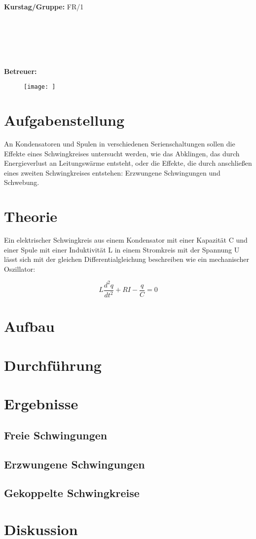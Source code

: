 \documentclass{article}
\begin{document}
\begin{verbatim}


\end{verbatim}
			\begin{flushleft}
			\textbf{\Large{Kurstag/Gruppe:}} \Large{FR/1}
			\end{flushleft}

\begin{verbatim}






\end{verbatim}
			\begin{flushleft}
			\LARGE{\textbf{Betreuer:\Large{ }}}		
			\end{flushleft}
			
\begin{figure}
\texttt{[image: ]}
\end{figure}
\section{Aufgabenstellung}
An Kondensatoren und Spulen in verschiedenen Serienschaltungen sollen die Effekte eines Schwingkreises untersucht werden, wie das Abklingen, das durch Energieverlust an Leitungswärme entsteht, oder die Effekte, die durch anschließen eines zweiten Schwingkreises entstehen: Erzwungene Schwingungen und Schwebung.
\section{Theorie}
Ein elektrischer Schwingkreis aus einem Kondensator mit einer Kapazität C und einer Spule mit einer Induktivität L in einem Stromkreis mit der Spannung U lässt sich mit der gleichen Differentialgleichung beschreiben wie ein mechanischer Oszillator:

\begin{equation}
\label{HarmOsz}
L\frac{d^2q}{dt^2}+RI-\frac{q}{C}=0
\end{equation}
\section{Aufbau}

\section{Durchführung}

\section{Ergebnisse}
\subsection{Freie Schwingungen}
\subsection{Erzwungene Schwingungen}
\subsection{Gekoppelte Schwingkreise}
\section{Diskussion}		
																								
\end{document}
